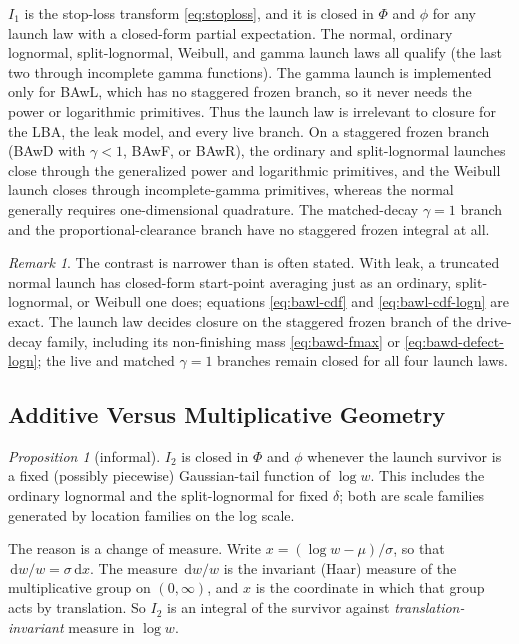 \documentclass[12pt]{article}
\newcommand{\dd}{\,\mathrm{d}}
\newcommand{\PhiN}{\Phi}
\newcommand{\phiN}{\phi}
\theoremstyle{remark}
\newtheorem{remark}{Remark}
\newtheorem{proposition}{Proposition}
\begin{document}
$I_1$ is the stop-loss transform \eqref{eq:stoploss}, and it is closed in $\PhiN$ and $\phiN$ for any launch law with a closed-form partial expectation. The normal, ordinary lognormal, split-lognormal, Weibull, and gamma launch laws all qualify (the last two through incomplete gamma functions). The gamma launch is implemented only for BAwL, which has no staggered frozen branch, so it never needs the power or logarithmic primitives. Thus the launch law is irrelevant to closure for the LBA, the leak model, and every live branch. On a staggered frozen branch (BAwD with $\gamma<1$, BAwF, or BAwR), the ordinary and split-lognormal launches close through the generalized power and logarithmic primitives, and the Weibull launch closes through incomplete-gamma primitives, whereas the normal generally requires one-dimensional quadrature. The matched-decay $\gamma=1$ branch and the proportional-clearance branch have no staggered frozen integral at all.


\begin{remark}
The contrast is narrower than is often stated. With leak, a truncated normal launch has closed-form start-point averaging just as an ordinary, split-lognormal, or Weibull one does; equations \eqref{eq:bawl-cdf} and \eqref{eq:bawl-cdf-logn} are exact. The launch law decides closure on the staggered frozen branch of the drive-decay family, including its non-finishing mass
\eqref{eq:bawd-fmax} or \eqref{eq:bawd-defect-logn}; the live and matched
$\gamma=1$ branches remain closed for all four launch laws.
\end{remark}

\subsection{Additive Versus Multiplicative Geometry}
\begin{proposition}[informal]
$I_2$ is closed in $\PhiN$ and $\phiN$ whenever the launch survivor is a fixed (possibly piecewise) Gaussian-tail function of $\log w$. This includes the ordinary lognormal and the split-lognormal for fixed $\delta$; both are scale families generated by location families on the log scale.
\end{proposition}

The reason is a change of measure. Write $x = (\log w - \mu)/\sigma$, so that $\dd w / w = \sigma \dd x$. The measure $\dd w / w$ is the invariant (Haar) measure of the multiplicative group on $(0,\infty)$, and $x$ is the coordinate in which that group acts by translation. So $I_2$ is an integral of the survivor against \emph{translation-invariant} measure in $\log w$.
\end{document}
